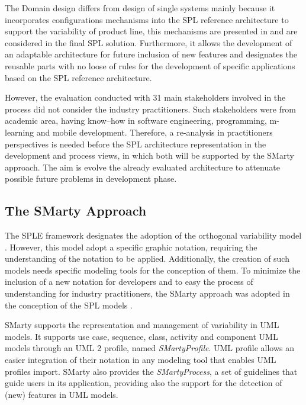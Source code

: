 
The Domain design differs from design of single systems mainly because it incorporates configurations mechanisms into the SPL reference architecture to support the variability of product line, this mechanisms are presented in \cite{marcolinoarcht2017} and are considered in the final SPL solution. Furthermore, it allows the development of an adaptable architecture for future inclusion of new features and designates the reusable parts with no loose of rules for the development of specific applications based on the SPL reference architecture.

However, the evaluation conducted with 31 main stakeholders involved in the process did not consider the industry practitioners. Such stakeholders were from academic area, having know--how in software engineering, programming, m-learning and mobile development. Therefore, a re-analysis in practitioners perspectives is needed before the SPL architecture representation in the development and process views, in which both will be supported by the SMarty approach. The aim is evolve the already evaluated architecture to attenuate possible future problems in development phase.


\subsection{The SMarty Approach}


The SPLE framework designates the adoption of the orthogonal variability model \cite{pohl2005}. However, this model adopt a specific graphic notation, requiring the understanding of the notation to be applied. Additionally, the creation of such models needs specific modeling tools for the conception of them. To minimize the inclusion of a new notation for developers and to easy the process of understanding for industry practitioners, the SMarty approach was adopted in the conception of the SPL models \cite{deOliveira2013, marcolino2013}.


SMarty supports the representation and management of variability in UML models. It supports use case, sequence, class, activity and component UML models through an UML 2 profile, named \textit{SMartyProfile}. UML profile allows an easier integration of their notation in any modeling tool that enables UML profiles import. SMarty also provides the \textit{SMartyProcess}, a set of guidelines that guide users in its application, providing also the support for the detection of (new) features in UML models.

